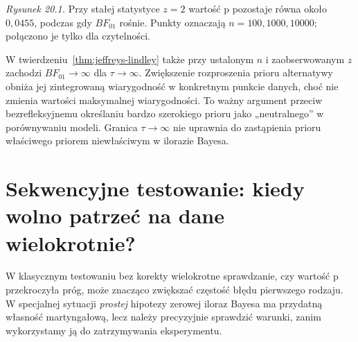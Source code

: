 \begin{center}
\begin{minipage}{.82\textwidth}
\centering
{}

{\small\emph{Rysunek 20.1.} Przy stałej statystyce $z=2$
wartość p pozostaje równa około $0{,}0455$, podczas gdy
$BF_{01}$ rośnie. Punkty oznaczają $n=100,1000,10000$;
połączono je tylko dla czytelności.}
\end{minipage}
\end{center}

\begin{uwaga}
W twierdzeniu~\ref{thm:jeffreys-lindley} także przy
ustalonym $n$ i zaobserwowanym $z$ zachodzi
$BF_{01}\to\infty$ dla $\tau\to\infty$.
Zwiększenie rozproszenia prioru alternatywy obniża jej
zintegrowaną wiarygodność w konkretnym punkcie danych,
choć nie zmienia wartości maksymalnej wiarygodności.
To ważny argument przeciw bezrefleksyjnemu określaniu
bardzo szerokiego prioru jako „neutralnego” w porównywaniu
modeli. Granica $\tau\to\infty$ nie uprawnia do zastąpienia
prioru właściwego priorem niewłaściwym w ilorazie Bayesa.
\end{uwaga}

\section{Sekwencyjne testowanie: kiedy wolno patrzeć na dane wielokrotnie?}
W klasycznym testowaniu bez korekty wielokrotne sprawdzanie,
czy wartość p przekroczyła próg, może znacząco zwiększać
częstość błędu pierwszego rodzaju. W specjalnej sytuacji
\emph{prostej} hipotezy zerowej iloraz Bayesa ma przydatną
własność martyngałową, lecz należy precyzyjnie sprawdzić
warunki, zanim wykorzystamy ją do zatrzymywania eksperymentu.

